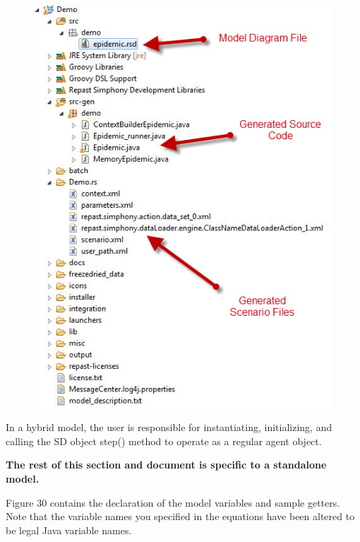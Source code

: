 \documentclass[11pt]{amsart}
\begin{document}
\begin{figure}[ht]
\begin{center}
\vspace{.2in}
\centerline {
\includegraphics[totalheight=0.45\textheight]{images/027.jpg}
}
\caption{}
\label{fig:027}
\end{center}
\end{figure}

In a hybrid model, the user is responsible for instantiating, initializing, and calling the SD object step() method to operate as a regular agent object.

\textbf{The rest of this section and document is specific to a standalone model.}

Figure 30 contains the declaration of the model variables and sample getters. Note that the variable names you specified in the equations have been altered to be legal Java variable names.
\end{document}
